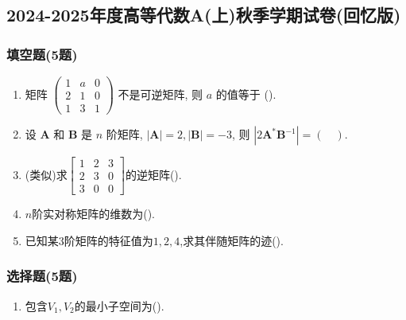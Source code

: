 \subsection{2024-2025年度高等代数A(上)秋季学期试卷(回忆版)}

\subsubsection*{填空题(5题)}
\begin{enumerate}
    \item 矩阵 $\left(\begin{array}{lll}1 & a & 0 \\ 2 & 1 & 0 \\ 1 & 3 & 1\end{array}\right)$ 不是可逆矩阵, 则 $a$ 的值等于 (\quad).
    \item 设 $\boldsymbol{A}$ 和 $\boldsymbol{B}$ 是 $n$ 阶矩阵, $|\boldsymbol{A}|=2,|\boldsymbol{B}|=-3$, 则 $\left|2 \boldsymbol{A}^* \boldsymbol{B}^{-1}\right|=(\quad)$.
    \item (类似)求$\begin{bmatrix}
        1 &2 &3\\
        2 &3 &0\\
        3 &0 &0
    \end{bmatrix}$的逆矩阵(\quad).
    \item $n$阶实对称矩阵的维数为(\quad).
    \item 已知某3阶矩阵的特征值为$1,2,4$,求其伴随矩阵的迹(\quad).
\end{enumerate}

\subsubsection*{选择题(5题)}
\begin{enumerate}
    \item 包含$V_1,V_2$的最小子空间为(\quad).
\end{enumerate}

